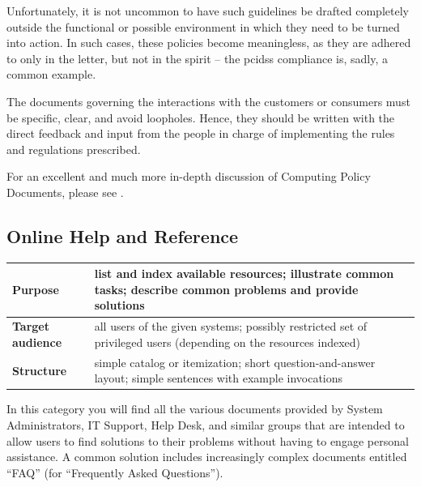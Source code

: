Unfortunately, it is not uncommon to have such
guidelines be drafted completely outside the
functional or possible environment in which they need
to be turned into action.  In such cases, these
policies become meaningless, as they are adhered to
only in the letter, but not in the spirit -- the
\gls{pcidss} compliance is, sadly, a
common example.

The documents governing the interactions with the
customers or consumers must be specific, clear, and
avoid loopholes.  Hence, they should be written with
the direct feedback and input from the people in
charge of implementing the rules and regulations
prescribed.

For an excellent and much more in-depth discussion of
Computing Policy Documents, please see \cite{doc:lisa-policies}.

\subsection{Online Help and Reference}
\label{documentation:types:help}

\vspace{.25in}
\begin{tabular}[ht]{ l p{}}
	\hline
	{\bf Purpose} & list and index available resources; \newline
			illustrate common tasks; \newline
			describe common problems and provide solutions \\
	\hline
	{\bf Target audience} & all users of the given systems; \newline
				possibly restricted set of privileged users (depending
				on the resources indexed) \\
	\hline
	{\bf Structure} &  simple catalog or itemization; \newline
				short question-and-answer layout; \newline
				simple sentences with example invocations \\
	\hline
\end{tabular}
\vspace{.25in}

In this category you will find all the various
documents provided by System Administrators, IT
Support, Help Desk, and similar
groups that are intended to allow users to find
solutions to their problems without having to engage
personal assistance.  A common solution includes
increasingly complex documents entitled
``FAQ'' (for ``Frequently Asked
Questions'').

